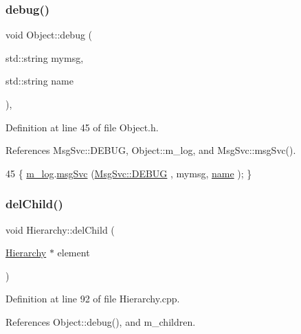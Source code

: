 \subsubsection{\texorpdfstring{debug()}{debug()}\hspace{0.1cm}{\footnotesize\ttfamily [2/2]}}
{\footnotesize\ttfamily void Object\+::debug (\begin{DoxyParamCaption}\item[{std\+::string}]{mymsg,  }\item[{std\+::string}]{name }\end{DoxyParamCaption})\hspace{0.3cm}{\ttfamily [inline]}, {\ttfamily [inherited]}}



Definition at line 45 of file Object.\+h.



References Msg\+Svc\+::\+D\+E\+B\+UG, Object\+::m\+\_\+log, and Msg\+Svc\+::msg\+Svc().


\begin{DoxyCode}
45 \{ \hyperlink{classObject_a0d269813dd7ac1f24bc143031e2963f2}{m\_log}.\hyperlink{classMsgSvc_ad25f18047920cc59a314e5098259711c}{msgSvc} (\hyperlink{classMsgSvc_ae671eb7301996cd049d2da8a65925926a1dbdcc82dce88370ec335883c83b38b0}{MsgSvc::DEBUG}   , mymsg, \hyperlink{classObject_a300f4c05dd468c7bb8b3c968868443c1}{name} ); \}
\end{DoxyCode}
\mbox{\label{classHierarchy_a2b2b359fac003233f65786a616766bde}} 
\subsubsection{\texorpdfstring{del\+Child()}{delChild()}\hspace{0.1cm}{\footnotesize\ttfamily [1/2]}}
{\footnotesize\ttfamily void Hierarchy\+::del\+Child (\begin{DoxyParamCaption}\item[{\hyperlink{classHierarchy}{Hierarchy} $\ast$}]{element }\end{DoxyParamCaption})}



Definition at line 92 of file Hierarchy.\+cpp.



References Object\+::debug(), and m\+\_\+children.



